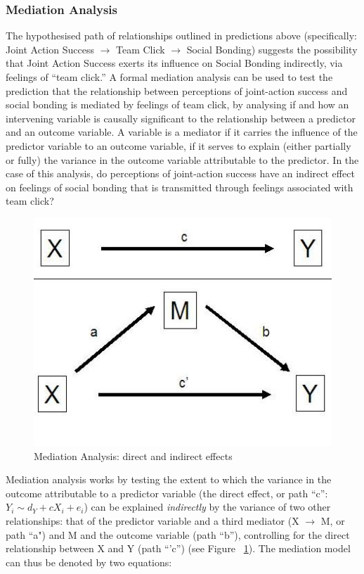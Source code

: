 \documentclass[12pt]{report}
\begin{document}
{\subsubsection{Mediation Analysis}
The hypothesised path of relationships outlined in predictions above (specifically: Joint Action Success $\rightarrow$ Team Click $\rightarrow$ Social Bonding) suggests the possibility that Joint Action Success exerts its influence on Social Bonding indirectly, via feelings of ``team click.''  A formal mediation analysis can be used to test the prediction that the relationship between perceptions of joint-action success and social bonding is mediated by feelings of team click, by analysing if and how an intervening variable is causally significant to the relationship between a predictor and an outcome variable. A variable is a mediator if it carries the influence of the predictor variable to an outcome variable, if it serves to explain (either partially or fully) the variance in the outcome variable attributable to the predictor. In the case of this analysis, do perceptions of joint-action success have an indirect effect on feelings of social bonding that is transmitted through feelings associated with team click?

\begin{figure}[htbp]
  \begin{center}
    \includegraphics[scale = .5]{../images/mediation_image.jpg}
    \caption{Mediation Analysis: direct and indirect effects}
    \label{fig:mediationAnalysis}
  \end{center}
\end{figure}

Mediation analysis works by testing the extent to which the variance in the outcome attributable to a predictor variable (the direct effect, or path ``c'': $Y_i \sim d_Y + cX_i + e_i$) can be explained \textit{indirectly} by the variance of two other relationships: that of the predictor variable and a third mediator (X $\rightarrow$ M, or path ``a")  and M and the outcome variable (path ``b''), controlling for the direct relationship between X and Y (path ``'c'') (see Figure ~\ref{fig:mediationAnalysis}). The mediation model can thus be denoted by two equations:

}
\end{document}
